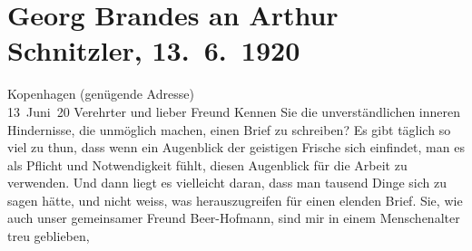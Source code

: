 

         
         \renewcommand{\erwaehntePersonen}{Personen: Richard Beer-Hofmann, Gaius Iulius Caesar, Rudolf Jeremias Kreutz, Peter Nansen, Olga Schnitzler, Heinrich Schnitzler, Lili Schnitzler}
         \renewcommand{\erwaehnteOrte}{Orte: Budapest, Deutschland, Dänemark, England, Europa, Frankreich, Istanbul, Italien, Kopenhagen, Moskau, Russland, Sankt Petersburg, Skandinavien, Wien, Österreich}
         \renewcommand{\erwaehnteWerke}{Werke: Die Schwestern oder Casanova in Spa. Lustspiel in Versen, Die große Phrase, Gaius Julius Cæsar, Jaákobs Traum. Ein Vorspiel, Michelangelo Buonarotti}
               \section[Georg Brandes an Arthur Schnitzler, 13. 6. 1920]{ Georg Brandes an Arthur Schnitzler, 13. 6. 1920}\nopagebreak{}\rehead{ }\begin{ledgroupsized}[t]{13cm}\normalsize\beginnumbering \toendnotes[C]{\smallbreak\pagebreak[2]} 
\toendnotes[C]{\smallbreak}\pstart
           \raggedleft{}{\pb}Kopenhagen (genügende Adresse){\\}13 Juni 20\pend
           \pstart{}Verehrter und lieber Freund \pend\pstart
           Kennen Sie die unverständlichen inneren Hindernisse, die \label{T_L02342_1v}\label{T_L02342_1h} unmöglich machen,
               einen Brief zu schreiben? Es gibt täglich so viel zu thun, dass wenn ein Augenblick
               der geistigen Frische sich einfindet, man es als Pflicht und Notwendigkeit fühlt,
               diesen Augenblick für die Arbeit zu verwenden. Und dann liegt es vielleicht daran,
               dass man tausend Dinge sich zu sagen hätte, und nicht weiss, was herauszugreifen für
               einen elenden Brief. Sie, wie auch unser gemeinsamer Freund Beer-Hofmann, sind mir in einem Menschenalter treu geblieben,

\end{ledgroupsized}
